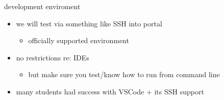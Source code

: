 \begin{frame}{development enviroment}
    \begin{itemize}
    \item we will test via something like SSH into portal
	\begin{itemize}
	\item officially supported environment
	\end{itemize}
    \vspace{.5cm}
    \item no restrictions re: IDEs
	\begin{itemize}
	\item but make sure you test/know how to run from command line
	\end{itemize}
    \item many students had success with VSCode + its SSH support
    \end{itemize}
\end{frame}
